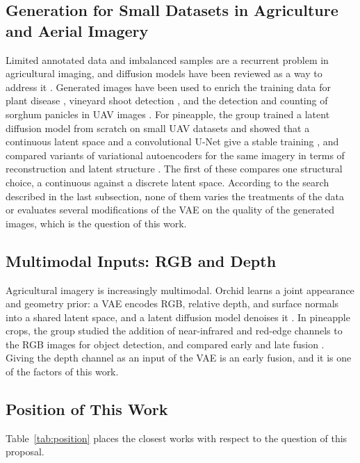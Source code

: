 \subsection{Generation for Small Datasets in Agriculture and Aerial Imagery}

Limited annotated data and imbalanced samples are a recurrent problem in agricultural imaging, and diffusion models have been reviewed as a way to address it \cite{Hu2025}. Generated images have been used to enrich the training data for plant disease \cite{Muhammad2023}, vineyard shoot detection \cite{Hirahara2025}, and the detection and counting of sorghum panicles in UAV images \cite{Cai2022}. For pineapple, the group trained a latent diffusion model from scratch on small UAV datasets and showed that a continuous latent space and a convolutional U-Net give a stable training \cite{Gonzalez2026}, and compared variants of variational autoencoders for the same imagery in terms of reconstruction and latent structure \cite{XieLi2025VAE}. The first of these compares one structural choice, a continuous against a discrete latent space. According to the search described in the last subsection, none of them varies the treatments of the data or evaluates several modifications of the VAE on the quality of the generated images, which is the question of this work.

\subsection{Multimodal Inputs: RGB and Depth}

Agricultural imagery is increasingly multimodal. Orchid learns a joint appearance and geometry prior: a VAE encodes RGB, relative depth, and surface normals into a shared latent space, and a latent diffusion model denoises it \cite{Krishnan2025}. In pineapple crops, the group studied the addition of near-infrared and red-edge channels to the RGB images for object detection, and compared early and late fusion \cite{Gonzalez2023MS}. Giving the depth channel as an input of the VAE is an early fusion, and it is one of the factors of this work.

\subsection{Position of This Work}

Table~\ref{tab:position} places the closest works with respect to the question of this proposal.

